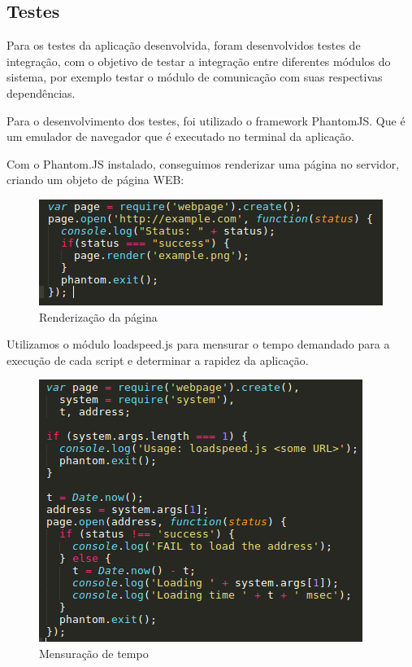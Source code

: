 	\subsection{Testes}
	
	Para os testes da aplicação desenvolvida, foram desenvolvidos testes de integração, com o objetivo de testar a integração entre diferentes módulos do sistema, por exemplo testar o módulo de comunicação com suas respectivas dependências.
	
	Para o desenvolvimento dos testes, foi utilizado o framework PhantomJS. Que é um emulador de navegador que é executado no terminal da aplicação.
	
	Com o Phantom.JS instalado, conseguimos renderizar uma página no servidor, criando um objeto de página WEB:
	
	\begin{figure}[h!]
		\centering
		\includegraphics[scale=0.60]{renderiza_pagina.png}
		\caption{Renderização da página}
		\label{img:Renderiza_pagina}
	\end{figure}
	
	Utilizamos o módulo loadspeed.js para mensurar o tempo demandado para a execução de cada script e determinar a rapidez da aplicação.
	
	\newpage
	
	\begin{figure}[!htp]
		\centering
		\includegraphics[scale=0.60]{mensuracao_de_tempo.png}
		\caption{Mensuração de tempo}
		\label{img:Mensuracao_tempo}
	\end{figure}
	

